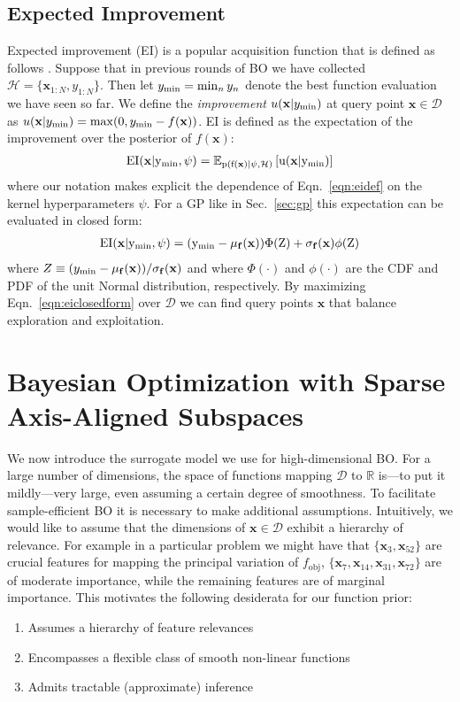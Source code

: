 \documentclass[accepted]{uai2021} %
\newcommand{\fobj}{f_{\text{obj}}}
\newcommand{\bff}{\mathbf{f}}
\newcommand{\bx}{\mathbf{x}}
\newcommand{\EE}{\mathbb{E}}
\newcommand{\DD}{\mathcal{D}}
\begin{document}
\subsection{Expected Improvement}
\label{sec:ei}

Expected improvement (EI) is a popular acquisition function that is defined as follows \citep{mockus1978toward, jones1998efficient}.
Suppose that in previous rounds of BO we have collected $\mathcal{H} = \{\bx_{1:N}, y_{1:N}\}$.
Then let $y_{\rm min} = {\rm min}_n \, y_n$ denote the best function
evaluation we have seen so far.
We define the \emph{improvement} $u(\bx | y_{\rm min})$ at query point $\bx \in \DD$ as
$u(\bx | y_{\rm min}) = {\rm max}(0, y_{\rm min} - f(\bx))$.
EI is defined as the expectation of the improvement over the posterior of $f(\bx)$:
\begin{align}
\label{eqn:eidef}
\rm{EI}(\bx |  y_{\rm min}, \psi) = \EE_{p(f(\bx) | \psi, \mathcal{H})} \left[ u(\bx | y_{\rm min}) \right]
\end{align}
 where our notation makes explicit the dependence of Eqn.~\eqref{eqn:eidef} on the kernel hyperparameters $\psi$.
For a GP like in Sec.~\ref{sec:gp} this expectation can be evaluated in closed form:
\begin{align}
\label{eqn:eiclosedform}
\rm{EI}(\bx |  y_{\rm min}, \psi) = (y_{\rm min} - \mu_\bff(\bx)) \Phi(Z) + \sigma_\bff(\bx) \phi(Z)
\end{align}
 where $Z \equiv (y_{\rm min} - \mu_\bff(\bx) ) / \sigma_\bff(\bx)$
and where $\Phi(\cdot)$ and $\phi(\cdot)$ are the CDF and PDF of the unit Normal distribution,
respectively.
By maximizing Eqn.~\eqref{eqn:eiclosedform} over $\DD$ we can find query points
$\bx$ that balance exploration and exploitation.


\section{Bayesian Optimization with Sparse Axis-Aligned Subspaces}
\label{sec:method}
We now introduce the surrogate model we use for high-dimensional BO.
For a large number of dimensions, the space of functions mapping
$\DD$ to $\mathbb{R}$ is---to put it mildly---very large, even assuming a certain degree of smoothness.
To facilitate sample-efficient BO it is necessary to make additional assumptions.
Intuitively, we would like to assume that the dimensions of $\bx \in \DD$ exhibit a hierarchy of relevance.
For example in a particular problem we might have that $\{ \bx_{3}, \bx_{52} \}$ are crucial features
for mapping the principal variation of $\fobj$, $\{ \bx_{7}, \bx_{14}, \bx_{31}, \bx_{72} \}$ are of moderate importance,
while the remaining features are of marginal importance.
This motivates the following desiderata for our function prior:
\begin{enumerate}[topsep=0pt,itemsep=-0.75ex,partopsep=1ex,parsep=1ex]
\item Assumes a hierarchy of feature relevances
\item Encompasses a flexible class of smooth non-linear functions
\item Admits tractable (approximate) inference
\end{enumerate}
\end{document}
